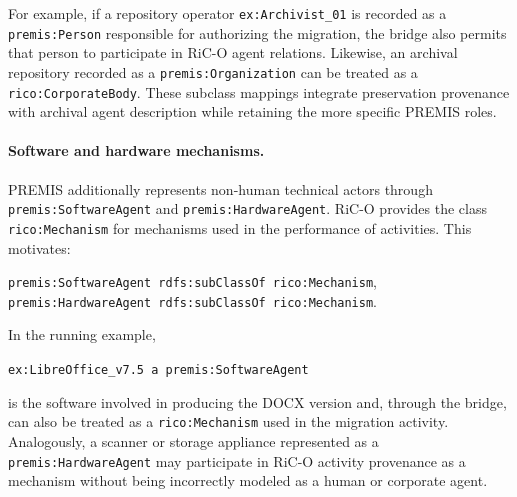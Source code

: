 \documentclass[runningheads]{llncs}
\begin{document}
For example, if a repository operator
\texttt{ex:Archivist\_01} is recorded as a \texttt{premis:Person} responsible
for authorizing the migration, the bridge also permits that person to
participate in RiC-O agent relations. Likewise, an archival repository
recorded as a \texttt{premis:Organization} can be treated as a
\texttt{rico:CorporateBody}. These subclass mappings integrate preservation
provenance with archival agent description while retaining the more specific
PREMIS roles.

\paragraph{Software and hardware mechanisms.}
PREMIS additionally represents non-human technical actors through
\texttt{premis:SoftwareAgent} and \texttt{premis:HardwareAgent}. RiC-O
provides the class \texttt{rico:Mechanism} for mechanisms used in the
performance of activities. This motivates:

\begin{center}
	\texttt{premis:SoftwareAgent rdfs:subClassOf rico:Mechanism},\\
	\texttt{premis:HardwareAgent rdfs:subClassOf rico:Mechanism}.
\end{center}

In the running example,

\begin{center}
	\texttt{ex:LibreOffice\_v7.5 a premis:SoftwareAgent}
\end{center}

is the software involved in producing the DOCX version and, through the
bridge, can also be treated as a \texttt{rico:Mechanism} used in the
migration activity. Analogously, a scanner or storage appliance represented
as a \texttt{premis:HardwareAgent} may participate in RiC-O activity
provenance as a mechanism without being incorrectly modeled as a human or
corporate agent.
%
%
\end{document}
